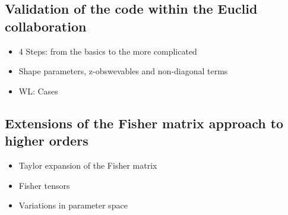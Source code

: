 \subsection{Validation of the code within the Euclid collaboration}
\begin{itemize}
\item 4 Steps: from the basics to the more complicated
\item Shape parameters, z-obswevables and non-diagonal terms
\item WL: Cases
\end{itemize}

\subsection{Extensions of the Fisher matrix approach to higher orders}
\begin{itemize}
\item Taylor expansion of the Fisher matrix
\item Fisher tensors
\item Variations in parameter space
\end{itemize}



